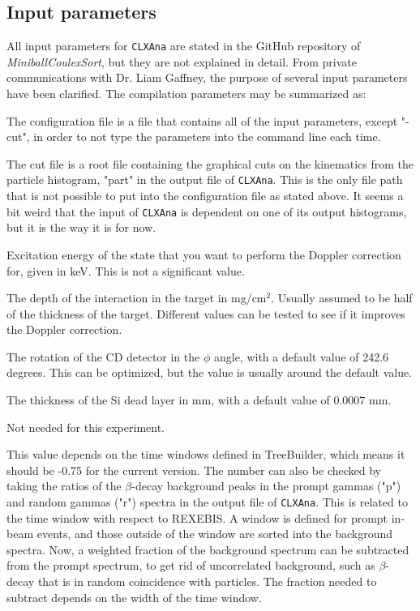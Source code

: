 \documentclass[twoside,english]{uiofysmaster/uiofysmaster}
\begin{document}
\begin{appendices}
\subsection{Input parameters}
All input parameters for \texttt{CLXAna} are stated in the GitHub repository of \textsl{MiniballCoulexSort}, but they are not explained in detail. 
From private communications with Dr. Liam Gaffney, the purpose of several input parameters have been clarified. 
The compilation parameters may be summarized as:
\begin{description}[align=left]
	\item [-c] The configuration file is a file that contains all of the input parameters, except "-cut", in order to not type the parameters into the command line each time.
	\item [-cut] The cut file  is a root file containing the graphical cuts on the kinematics from the particle histogram, "part" in the output file of \texttt{CLXAna}. 
	This is the only file path that is not possible to put into the configuration file as stated above. 
	\newline It seems a bit weird that the input of \texttt{CLXAna} is dependent on one of its output histograms, but it is the way it is for now. 
	\item [-Ex] Excitation energy of the state that you want to perform the Doppler correction for, given in keV. This is not a significant value.
	\item [-depth] The depth of the interaction in the target in mg/cm$^2$. 
	Usually assumed to be half of the thickness of the target. 
	Different values can be tested to see if it improves the Doppler correction.
	\item [-cdoffset] The rotation of the CD detector in the $\phi$ angle, with a default value of 242.6 degrees. 
	This can be optimized, but the value is usually around the default value.
	\item [-deadlayer] The thickness of the Si dead layer in mm, with a default value of 0.0007 mm.
	\item [-spededist] Not needed for this experiment.
	\item [-bg\_frac] This value depends on the time windows defined in TreeBuilder, which means it should be -0.75 for the current version. 
	The number can also be checked by taking the ratios of the $\beta$-decay background peaks in the prompt gammas ("p") and random gammas ("r") spectra in the output file of \texttt{CLXAna}.
	This is related to the time window with respect to REXEBIS. 
	A window is defined for prompt in-beam events, and those outside of the window are sorted into the background spectra. 
	Now, a weighted fraction of the background spectrum can be subtracted from the prompt spectrum, to get rid of uncorrelated background, such as $\beta$-decay that is in random coincidence with particles. 
	The fraction needed to subtract depends on the width of the time window.
\end{description}


\end{appendices}
\end{document}
